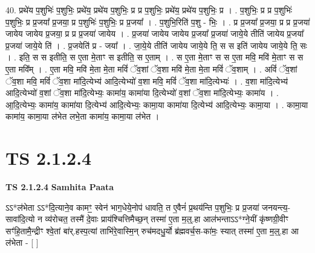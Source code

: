 \documentclass[17pt]{extarticle}
\begin{document}
40. प्रथे॑य प॒शुभिः॑ प॒शुभिः॒ प्रथे॑य॒ प्रथे॑य प॒शुभिः॒ प्र प्र प॒शुभिः॒ प्रथे॑य॒ प्रथे॑य प॒शुभिः॒ प्र । . प॒शुभिः॒ प्र प्र प॒शुभिः॑ प॒शुभिः॒ प्र प्र॒जया᳚ प्र॒जया॒ प्र प॒शुभिः॑ प॒शुभिः॒ प्र प्र॒जया᳚ । . प॒शुभि॒रिति॑ प॒शु - भिः॒ । . प्र प्र॒जया᳚ प्र॒जया॒ प्र प्र प्र॒जया॑ जायेय जायेय प्र॒जया॒ प्र प्र प्र॒जया॑ जायेय । . प्र॒जया॑ जायेय जायेय प्र॒जया᳚ प्र॒जया॑ जाये॒ये तीति॑ जायेय प्र॒जया᳚ प्र॒जया॑ जाये॒ये ति॑ । . प्र॒जयेति॑ प्र - जया᳚ । . जा॒ये॒ये तीति॑ जायेय जाये॒ये ति॒ स स इति॑ जायेय जाये॒ये ति॒ सः । . इति॒ स स इतीति॒ स ए॒ता मे॒ताꣳ स इतीति॒ स ए॒ताम् । . स ए॒ता मे॒ताꣳ स स ए॒ता मवि॒ मवि॑ मे॒ताꣳ स स ए॒ता मवि᳚म् । . ए॒ता मवि॒ मवि॑ मे॒ता मे॒ता मविं॑ ॅव॒शां ॅव॒शा मवि॑ मे॒ता मे॒ता मविं॑ ॅव॒शाम् । . अविं॑ ॅव॒शां ॅव॒शा मवि॒ मविं॑ ॅव॒शा मा॑दि॒त्येभ्य॑ आदि॒त्येभ्यो॑ व॒शा मवि॒ मविं॑ ॅव॒शा मा॑दि॒त्येभ्यः॑ । . व॒शा मा॑दि॒त्येभ्य॑ आदि॒त्येभ्यो॑ व॒शां ॅव॒शा मा॑दि॒त्येभ्यः॒ कामा॑य॒ कामा॑या दि॒त्येभ्यो॑ व॒शां ॅव॒शा मा॑दि॒त्येभ्यः॒ कामा॑य । . आ॒दि॒त्येभ्यः॒ कामा॑य॒ कामा॑या दि॒त्येभ्य॑ आदि॒त्येभ्यः॒ कामा॒या कामा॑या दि॒त्येभ्य॑ आदि॒त्येभ्यः॒ कामा॒या । . कामा॒या कामा॑य॒ कामा॒या ल॑भेत लभे॒ता कामा॑य॒ कामा॒या ल॑भेत । \newline
\pagebreak
{}
\section*{ TS 2.1.2.4 }

\textbf{TS 2.1.2.4 } \newline
\textbf{Samhita Paata} \newline

ऽऽ*ल॑भेता ऽऽ*दि॒त्याने॒व कामꣳ॒॒ स्वेन॑ भाग॒धेये॒नोप॑ धावति॒ त ए॒वैनं॑ प्र॒थय॑न्ति प॒शुभिः॒ प्र प्र॒जया॑ जनयन्त्य॒-सावा॑दि॒त्यो न व्य॑रोचत॒ तस्मै॑ दे॒वाः प्राय॑श्चित्तिमैच्छ॒न् तस्मा॑ ए॒ता म॒ल्॒.हा आल॑भन्ताऽऽ*ग्ने॒यीं कृ॑ष्णग्री॒वीꣳ सꣳ॑हि॒तामै॒न्द्रीꣳ श्वे॒तां बा॑र्.हस्प॒त्यां ताभि॑रे॒वास्मि॒न् रुच॑मदधु॒र्यो ब्र॑ह्मवर्च॒स-का॑मः॒ स्यात् तस्मा॑ ए॒ता म॒॒ल्॒.हा आ ल॑भेता - [  ] \newline
\end{document}

